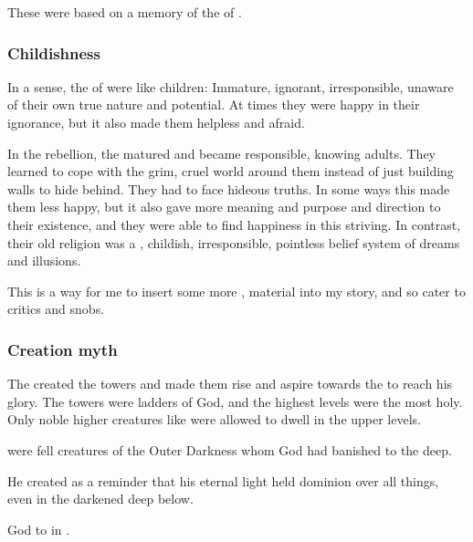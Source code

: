 These were based on a memory of the  of \Erebos. 





\subsubsection{Childishness}
In a sense, the \resphain of \Merkyrah were like children: 
Immature, ignorant, irresponsible, unaware of their own true nature and potential.
At times they were happy in their ignorance, but it also made them helpless and afraid. 

In the rebellion, the \resphain matured and became responsible, knowing adults. 
They learned to cope with the grim, cruel world around them instead of just building walls to hide behind. 
They had to face hideous truths. 
In some ways this made them less happy, but it also gave more meaning and purpose and direction to their existence, and they were able to find happiness in this striving. 
In contrast, their old religion was a \naive, childish, irresponsible, pointless belief system of dreams and illusions. 

This is a way for me to insert some more ,  material into my story, and so cater to critics and snobs. 





\subsubsection{Creation myth}
The  created the towers and made them rise and aspire towards the  to reach his glory.
The towers were ladders of God, and the highest levels were the most holy. 
Only noble higher creatures like \resphain were allowed to dwell in the upper levels. 

 were fell creatures of the Outer Darkness whom God had banished to the deep. 

He created \glowmoss as a reminder that his eternal light held dominion over all things, even in the darkened deep below.

God  to  in .





